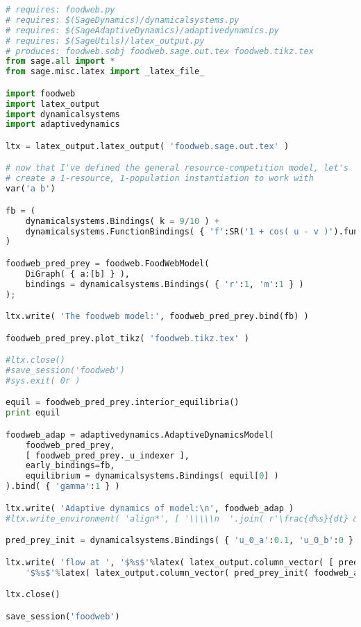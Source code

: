 \begin{lstlisting}[language=Python]
# requires: foodweb.py
# requires: $(SageDynamics)/dynamicalsystems.py
# requires: $(SageAdaptiveDynamics)/adaptivedynamics.py
# requires: $(SageUtils)/latex_output.py
# produces: foodweb.sobj foodweb.sage.out.tex foodweb.tikz.tex
from sage.all import * 
from sage.misc.latex import _latex_file_

import foodweb
import latex_output
import dynamicalsystems
import adaptivedynamics

ltx = latex_output.latex_output( 'foodweb.sage.out.tex' )

# now that I've defined the general resource-competition model, let's
# create a 1-resource, 1-population instantiation to work with
var('a b')

fb = (
    dynamicalsystems.Bindings( k = 9/10 ) +
    dynamicalsystems.FunctionBindings( { 'f':SR('1 + cos( u - v )').function(SR('u'),SR('v')) } )
)

foodweb_pred_prey = foodweb.FoodWebModel(
    DiGraph( { a:[b] } ),
    bindings = dynamicalsystems.Bindings( { 'r':1, 'm':1 } )
);

ltx.write( 'The foodweb model:', foodweb_pred_prey.bind(fb) )

foodweb_pred_prey.plot_tikz( 'foodweb.tikz.tex' )

#ltx.close()
#save_session('foodweb')
#sys.exit( 0r )

equil = foodweb_pred_prey.interior_equilibria()
print equil

foodweb_adap = adaptivedynamics.AdaptiveDynamicsModel( 
    foodweb_pred_prey,
    [ foodweb_pred_prey._u_indexer ],
    early_bindings=fb,
    equilibrium = dynamicalsystems.Bindings( equil[0] )
).bind( { 'gamma':1 } )

ltx.write( 'Adaptive dynamics of model:\n', foodweb_adap )
#ltx.write_environment( 'align*', [ '\\\\\n  '.join( r'\frac{d%s}{dt} &\propto %s' % (latex(v), latex(foodweb_adap._S[v])) for v in foodweb_adap._vars ) ] )

pred_prey_init = dynamicalsystems.Bindings( { 'u_0_a':0.1, 'u_0_b':0 } )

ltx.write( 'flow at ', '$%s$'%latex( latex_output.column_vector( [ pred_prey_init( v ) for v in foodweb_adap._vars ] ) ), ': ', 
    '$%s$'%latex( latex_output.column_vector( pred_prey_init( foodweb_adap._flow[v] ) for v in foodweb_adap._vars ) ) )

ltx.close()

save_session('foodweb')
\end{lstlisting}
